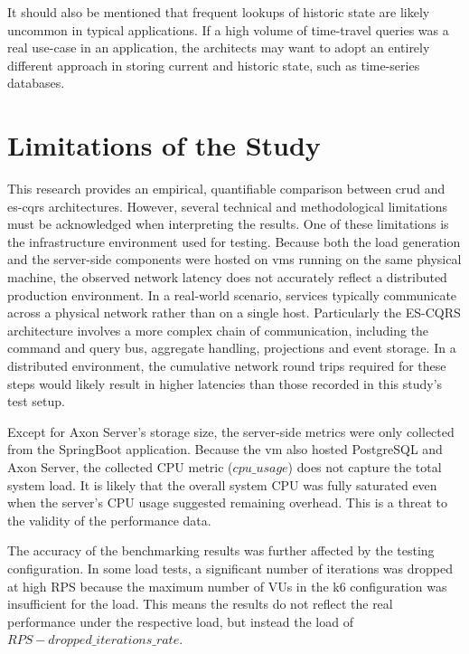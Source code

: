 It should also be mentioned that frequent lookups of historic state are likely uncommon in typical applications. If a high volume of time-travel queries was a real use-case in an application, the architects may want to adopt an entirely different approach in storing current and historic state, such as time-series databases.

\section{Limitations of the Study}
\label{sec:limitations-of-the-study}

This research provides an empirical, quantifiable comparison between \gls{crud} and \gls{es}-\gls{cqrs} architectures. However, several technical and methodological limitations must be acknowledged when interpreting the results. One of these limitations is the infrastructure environment used for testing. Because both the load generation and the server-side components were hosted on \glspl{vm} running on the same physical machine, the observed network latency does not accurately reflect a distributed production environment. In a real-world scenario, services typically communicate across a physical network rather than on a single host. Particularly the ES-CQRS architecture involves a more complex chain of communication, including the command and query bus, aggregate handling, projections and event storage. In a distributed environment, the cumulative network round trips required for these steps would likely result in higher latencies than those recorded in this study's test setup.

Except for Axon Server's storage size, the server-side metrics were only collected from the SpringBoot application. Because the \gls{vm} also hosted PostgreSQL and Axon Server, the collected CPU metric ($cpu\_usage$) does not capture the total system load. It is likely that the overall system CPU was fully saturated even when the server's CPU usage suggested remaining overhead. This is a threat to the validity of the performance data.

The accuracy of the benchmarking results was further affected by the testing configuration. In some load tests, a significant number of iterations was dropped at high RPS because the maximum number of \glspl{VU} in the k6 configuration was insufficient for the load. This means the results do not reflect the real performance under the respective load, but instead the load of $RPS - dropped\_iterations\_rate$.

